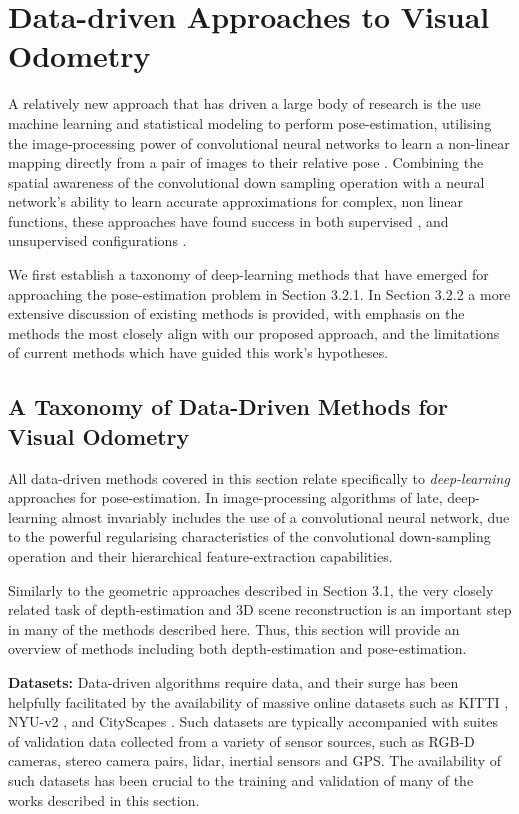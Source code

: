 \section{Data-driven Approaches to Visual Odometry}

A relatively new approach that has driven a large body of research is the use machine learning and statistical modeling to perform pose-estimation, utilising the image-processing power of convolutional neural networks to learn a non-linear mapping directly from a pair of images to their relative pose \cite{eigen2014supervised, garg2016unsupervised,godard2016consistency, liu2015supervised, zhou2017unsupervised}.  Combining the spatial awareness of the convolutional down sampling operation with a neural network's ability to learn accurate approximations for complex, non linear functions, these approaches have found success in both supervised \cite{eigen2014supervised, liu2015supervised}, and unsupervised configurations \cite{garg2016unsupervised, godard2016consistency, zhou2017unsupervised}. 


We first establish a taxonomy of deep-learning methods that have emerged for approaching the pose-estimation problem in Section 3.2.1. In Section 3.2.2 a more extensive discussion of existing methods is provided, with emphasis on the methods the most closely align with our proposed approach, and the limitations of current methods which have guided this work's hypotheses. 


\subsection{A Taxonomy of Data-Driven Methods for Visual Odometry}

All data-driven methods covered in this section relate specifically to \textit{deep-learning} approaches for pose-estimation. In image-processing algorithms of late, deep-learning almost invariably includes the use of a convolutional neural network, due to the powerful regularising characteristics of the convolutional down-sampling operation and their hierarchical feature-extraction capabilities. 

Similarly to the geometric approaches described in Section 3.1, the very closely related task of depth-estimation and 3D scene reconstruction is an important step in many of the methods described here. Thus, this section will provide an overview of methods including both depth-estimation and pose-estimation.

\textbf{Datasets: } Data-driven algorithms require data, and their surge has been helpfully facilitated by the availability of massive online datasets such as KITTI \cite{dataset-kitti}, NYU-v2 \cite{dataset-nyuv2}, and CityScapes \cite{dataset-cityscapes}. Such datasets are typically accompanied with suites of validation data collected from a variety of sensor sources, such as RGB-D cameras, stereo camera pairs, lidar, inertial sensors and GPS. The availability of such datasets has been crucial to the training and validation of many of the works described in this section.

